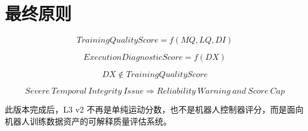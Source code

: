 \documentclass[UTF8,zihao=-4]{ctexart}
\begin{document}
\section{最终原则}

\[
TrainingQualityScore=f(MQ,LQ,DI)
\]

\[
ExecutionDiagnosticScore=f(DX)
\]

\[
DX\notin TrainingQualityScore
\]

\[
Severe\ Temporal\ Integrity\ Issue\Rightarrow Reliability\ Warning\ and\ Score\ Cap
\]

此版本完成后，L3 v2 不再是单纯运动分数，也不是机器人控制器评分，而是面向机器人训练数据资产的可解释质量评估系统。
\end{document}
